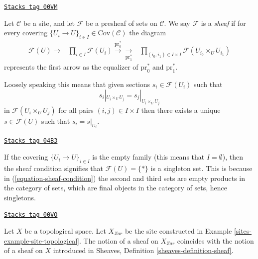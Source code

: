 \begin{definition}
\label{sites-definition-sheaf-sets}
\href{https://stacks.math.columbia.edu/tag/00VM}{\texttt{Stacks tag 00VM}}

Let $\mathcal{C}$ be a site, and let $\mathcal{F}$ be a presheaf of sets
on $\mathcal{C}$. We say $\mathcal{F}$ is a {\it sheaf} if
for every covering $\{U_i \to U\}_{i \in I} \in \text{Cov}(\mathcal{C})$
the diagram
\begin{equation}
\label{equation-sheaf-condition}
\begin{array}{ccc}\mathcal{F}(U) \longrightarrow & \prod\nolimits_{i\in I}
\mathcal{F}(U_i)
\overset{\text{pr}_0^*}{\longrightarrow}\underset{\text{pr}_1^*}{\longrightarrow} & \prod\nolimits_{(i_0, i_1) \in I \times I}
\mathcal{F}(U_{i_0} \times_U U_{i_1})\end{array}
\end{equation}
represents the first arrow as the equalizer of $\text{pr}_0^*$
and $\text{pr}_1^*$.
\end{definition}

Loosely speaking this means that given sections $s_i \in \mathcal{F}(U_i)$
such that
$$
s_i|_{U_i \times_U U_j} = s_j|_{U_i \times_U U_j}
$$
in $\mathcal{F}(U_i \times_U U_j)$ for all pairs $(i, j) \in I \times I$
then there exists a unique $s \in \mathcal{F}(U)$ such
that $s_i = s|_{U_i}$.

\begin{remark}
\label{sites-remark-sheaf-condition-empty-covering}
\href{https://stacks.math.columbia.edu/tag/04B3}{\texttt{Stacks tag 04B3}}

If the covering $\{U_i \to U\}_{i \in I}$ is the empty family (this means
that $I = \emptyset$), then the sheaf condition signifies that
$\mathcal{F}(U) = \{*\}$ is a singleton set. This is because
in (\ref{equation-sheaf-condition}) the second and third sets
are empty products in the category of sets, which are final objects
in the category of sets, hence singletons.
\end{remark}

\begin{example}
\label{sites-example-sheaves-topological}
\href{https://stacks.math.columbia.edu/tag/00VO}{\texttt{Stacks tag 00VO}}

Let $X$ be a topological space. Let $X_{Zar}$ be the
site constructed in Example \ref{sites-example-site-topological}.
The notion of a sheaf on $X_{Zar}$ coincides
with the notion of a sheaf on $X$ introduced in
Sheaves, Definition \ref{sheaves-definition-sheaf}.
\end{example}

